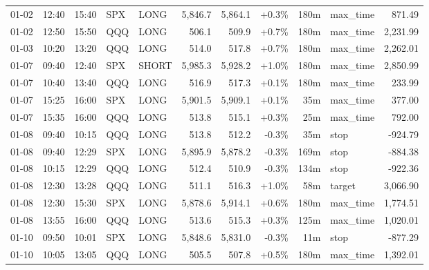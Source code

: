 \documentclass[11pt,a4paper,twoside]{article}
\begin{document}
\begin{center}
\begin{longtable}{>{\color{txtmain}}l l l l l r r r r >{\color{txtmain}}l r}
01-02 & 12:40 & 15:40 & SPX & LONG & 5,846.7 & 5,864.1 & \textcolor{wingreen}{+0.3\%} & 180m & max\_time & \textcolor{wingreen}{871.49} \\
01-02 & 12:50 & 15:50 & QQQ & LONG & 506.1 & 509.9 & \textcolor{wingreen}{+0.7\%} & 180m & max\_time & \textcolor{wingreen}{2,231.99} \\
01-03 & 10:20 & 13:20 & QQQ & LONG & 514.0 & 517.8 & \textcolor{wingreen}{+0.7\%} & 180m & max\_time & \textcolor{wingreen}{2,262.01} \\
01-07 & 09:40 & 12:40 & SPX & SHORT & 5,985.3 & 5,928.2 & \textcolor{wingreen}{+1.0\%} & 180m & max\_time & \textcolor{wingreen}{2,850.99} \\
01-07 & 10:40 & 13:40 & QQQ & LONG & 516.9 & 517.3 & \textcolor{wingreen}{+0.1\%} & 180m & max\_time & \textcolor{wingreen}{233.99} \\
01-07 & 15:25 & 16:00 & SPX & LONG & 5,901.5 & 5,909.1 & \textcolor{wingreen}{+0.1\%} & 35m & max\_time & \textcolor{wingreen}{377.00} \\
01-07 & 15:35 & 16:00 & QQQ & LONG & 513.8 & 515.1 & \textcolor{wingreen}{+0.3\%} & 25m & max\_time & \textcolor{wingreen}{792.00} \\
01-08 & 09:40 & 10:15 & QQQ & LONG & 513.8 & 512.2 & \textcolor{lossred}{-0.3\%} & 35m & stop & \textcolor{lossred}{-924.79} \\
01-08 & 09:40 & 12:29 & SPX & LONG & 5,895.9 & 5,878.2 & \textcolor{lossred}{-0.3\%} & 169m & stop & \textcolor{lossred}{-884.38} \\
01-08 & 10:15 & 12:29 & QQQ & LONG & 512.4 & 510.9 & \textcolor{lossred}{-0.3\%} & 134m & stop & \textcolor{lossred}{-922.36} \\
01-08 & 12:30 & 13:28 & QQQ & LONG & 511.1 & 516.3 & \textcolor{wingreen}{+1.0\%} & 58m & target & \textcolor{wingreen}{3,066.90} \\
01-08 & 12:30 & 15:30 & SPX & LONG & 5,878.6 & 5,914.1 & \textcolor{wingreen}{+0.6\%} & 180m & max\_time & \textcolor{wingreen}{1,774.51} \\
01-08 & 13:55 & 16:00 & QQQ & LONG & 513.6 & 515.3 & \textcolor{wingreen}{+0.3\%} & 125m & max\_time & \textcolor{wingreen}{1,020.01} \\
01-10 & 09:50 & 10:01 & SPX & LONG & 5,848.6 & 5,831.0 & \textcolor{lossred}{-0.3\%} & 11m & stop & \textcolor{lossred}{-877.29} \\
01-10 & 10:05 & 13:05 & QQQ & LONG & 505.5 & 507.8 & \textcolor{wingreen}{+0.5\%} & 180m & max\_time & \textcolor{wingreen}{1,392.01} \\

\end{longtable}
\end{center}
\end{document}
